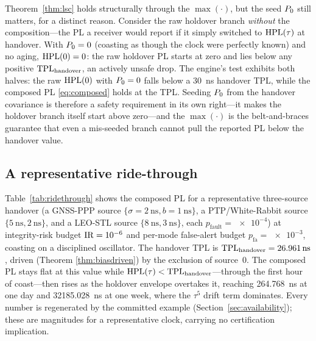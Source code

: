 Theorem~\ref{thm:lsc} holds structurally through the $\max(\cdot)$, but the seed
$P_0$ still matters, for a distinct reason. Consider the raw holdover branch
\emph{without} the composition---the PL a receiver would report if it simply
switched to $\mathrm{HPL}(\tau)$ at handover. With $P_0=0$ (coasting as though the clock
were perfectly known) and no aging, $\mathrm{HPL}(0)=0$: the raw holdover PL starts at
zero and lies below any positive $\mathrm{TPL}_{\mathrm{handover}}$, an actively unsafe
drop. The engine's test
 exhibits both
halves: the raw $\mathrm{HPL}(0)$ with $P_0=0$ falls below a
\SI{30}{\nano\second} handover TPL, while the composed PL \eqref{eq:composed} holds
at the TPL. Seeding $P_0$ from the handover covariance is therefore a safety
requirement in its own right---it makes the holdover branch itself start above
zero---and the $\max(\cdot)$ is the belt-and-braces guarantee that even a
mis-seeded branch cannot pull the reported PL below the handover value.

\subsection{A representative ride-through}
\label{sec:ridethrough}

Table~\ref{tab:ridethrough} shows the composed PL for a representative
three-source handover (a GNSS-PPP source $\{\sigma=\SI{2}{\nano\second},
b=\SI{1}{\nano\second}\}$, a PTP/White-Rabbit source $\{\SI{5}{\nano\second},
\SI{2}{\nano\second}\}$, and a LEO-STL source $\{\SI{8}{\nano\second},
\SI{3}{\nano\second}\}$, each $p_{\mathrm{fault}}=\num{e-4}$) at integrity-risk
budget $\mathrm{IR}=\num{e-6}$ and per-mode false-alert budget $p_{\mathrm{fa}}=\num{e-3}$,
coasting on a disciplined oscillator. The handover TPL is
$\mathrm{TPL}_{\mathrm{handover}}=\SI{26.961}{\nano\second}$, driven (Theorem
\ref{thm:biasdriven}) by the exclusion of source~0. The composed PL stays flat at
this value while $\mathrm{HPL}(\tau)<\mathrm{TPL}_{\mathrm{handover}}$---through the first hour of
coast---then rises as the holdover envelope overtakes it, reaching
\SI{264.768}{\nano\second} at one day and \SI{32185.028}{\nano\second} at one week,
where the $\tau^{5}$ drift term dominates. Every number is regenerated by the
committed example (Section~\ref{sec:availability}); these are \Modelled{}
magnitudes for a representative clock, carrying no certification implication.

